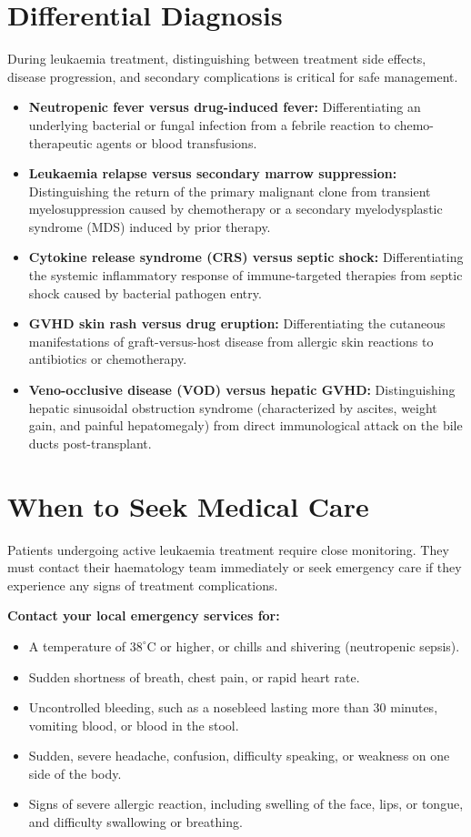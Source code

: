 \section*{Differential Diagnosis}
During leukaemia treatment, distinguishing between treatment side effects, disease progression, and secondary complications is critical for safe management.
\begin{itemize}
    \item \textbf{Neutropenic fever versus drug-induced fever:} Differentiating an underlying bacterial or fungal infection from a febrile reaction to chemo-therapeutic agents or blood transfusions.
    \item \textbf{Leukaemia relapse versus secondary marrow suppression:} Distinguishing the return of the primary malignant clone from transient myelosuppression caused by chemotherapy or a secondary myelodysplastic syndrome (MDS) induced by prior therapy.
    \item \textbf{Cytokine release syndrome (CRS) versus septic shock:} Differentiating the systemic inflammatory response of immune-targeted therapies from septic shock caused by bacterial pathogen entry.
    \item \textbf{GVHD skin rash versus drug eruption:} Differentiating the cutaneous manifestations of graft-versus-host disease from allergic skin reactions to antibiotics or chemotherapy.
    \item \textbf{Veno-occlusive disease (VOD) versus hepatic GVHD:} Distinguishing hepatic sinusoidal obstruction syndrome (characterized by ascites, weight gain, and painful hepatomegaly) from direct immunological attack on the bile ducts post-transplant.
\end{itemize}

\section*{When to Seek Medical Care}
Patients undergoing active leukaemia treatment require close monitoring. They must contact their haematology team immediately or seek emergency care if they experience any signs of treatment complications.

\textbf{Contact your local emergency services for:}
\begin{itemize}
    \item A temperature of $38^\circ$C or higher, or chills and shivering (neutropenic sepsis).
    \item Sudden shortness of breath, chest pain, or rapid heart rate.
    \item Uncontrolled bleeding, such as a nosebleed lasting more than 30 minutes, vomiting blood, or blood in the stool.
    \item Sudden, severe headache, confusion, difficulty speaking, or weakness on one side of the body.
    \item Signs of severe allergic reaction, including swelling of the face, lips, or tongue, and difficulty swallowing or breathing.
\end{itemize}

